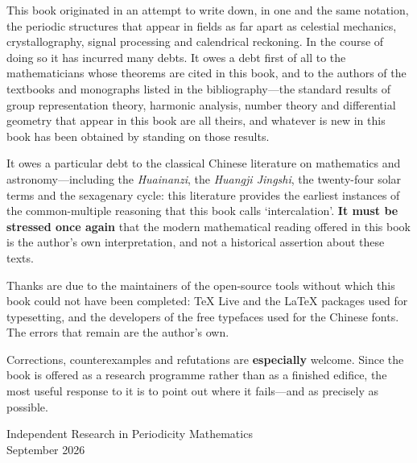 This book originated in an attempt to write down, in one and the same notation, the periodic structures that appear in fields as far apart as celestial mechanics, crystallography, signal processing and calendrical reckoning. In the course of doing so it has incurred many debts. It owes a debt first of all to the mathematicians whose theorems are cited in this book, and to the authors of the textbooks and monographs listed in the bibliography---the standard results of group representation theory, harmonic analysis, number theory and differential geometry that appear in this book are all theirs, and whatever is new in this book has been obtained by standing on those results.

It owes a particular debt to the classical Chinese literature on mathematics and astronomy---including the \textit{Huainanzi}, the \textit{Huangji Jingshi}, the twenty-four solar terms and the sexagenary cycle: this literature provides the earliest instances of the common-multiple reasoning that this book calls `intercalation'. \textbf{It must be stressed once again} that the modern mathematical reading offered in this book is the author's own interpretation, and not a historical assertion about these texts.

Thanks are due to the maintainers of the open-source tools without which this book could not have been completed: \TeX{} Live and the \LaTeX{} packages used for typesetting, and the developers of the free typefaces used for the Chinese fonts. The errors that remain are the author's own.

Corrections, counterexamples and refutations are \textbf{especially} welcome. Since the book is offered as a research programme rather than as a finished edifice, the most useful response to it is to point out where it fails---and as precisely as possible.

\vspace{1em}
\begin{flushright}
Independent Research in Periodicity Mathematics\\
September 2026
\end{flushright}

